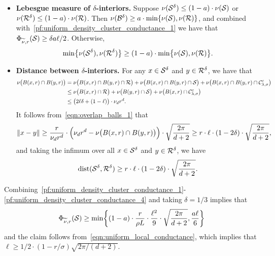 \begin{itemize}
\begin{equation}
		\end{equation}
		\item \textbf{Lebesgue measure of $\delta$-interiors.} Suppose $\nu(\mathcal{S}^{\delta}) \leq (1 - a) \cdot \nu(\mathcal{S})$ or $\nu(\mathcal{R}^{\delta}) \leq (1 - a) \cdot \nu(\mathcal{R})$. Then 
		$\nu(\mathcal{B}^{\delta}) \geq a \cdot \min\{\nu(\mathcal{S}), \nu(\mathcal{R})\}$, and combined with~\eqref{pf:uniform_density_cluster_conductance_1} we have that $\Phi_{\widetilde{\nu},r}(\mathcal{S}) \geq \delta a \ell/2$. Otherwise,
		\begin{equation}
		\label{pf:uniform_density_cluster_conductance_3}
		\min\bigl\{\nu(\mathcal{S}^{\delta}),\nu(\mathcal{R}^{\delta})\bigr\} \geq (1- a) \cdot \min\bigl\{\nu(\mathcal{S}),\nu(\mathcal{R})\bigr\}.
		\end{equation}
		\item \textbf{Distance between $\delta$-interiors.} For any $x \in \mathcal{S}^{\delta}$ and $y \in \mathcal{R}^{\delta}$, we have that 
		\begin{align*}
		\nu\bigl(B(x,r) \cap B(y,r)\bigr) & = \nu\bigl(B(x,r) \cap B(y,r) \cap \mathcal{R}\bigr) + \nu\bigl(B(x,r) \cap B(y,r) \cap \mathcal{S}\bigr) + \nu\bigl(B(x,r) \cap B(y,r) \cap \mathcal{C}_{\lambda,\sigma}^c\bigr) \\
		& \leq \nu\bigl(B(x,r) \cap \mathcal{R}\bigr) + \nu\bigl(B(y,r) \cap \mathcal{S}\bigr) + \nu\bigl(B(x,r) \cap \mathcal{C}_{\lambda,\sigma}^c\bigr) \\
		& \leq \bigl(2\ell\delta + (1 - \ell)\bigr) \cdot \nu_dr^d.
		\end{align*}
		It follows from~\eqref{eqn:overlap_balls_1} that
		\begin{equation*}
		\|x - y\| \geq \frac{r}{\nu_d r^d} \cdot \Bigl(\nu_d r^d - \nu\bigl(B(x,r) \cap B(y,r)\bigr)\Bigr) \cdot \sqrt{\frac{2\pi}{d + 2}} \geq r \cdot \ell \cdot (1 - 2\delta) \cdot \sqrt{\frac{2\pi}{d + 2}},
		\end{equation*}
		and taking the infimum over all $x \in \mathcal{S}^{\delta}$ and $y \in \mathcal{R}^{\delta}$, we have
		\begin{equation}
		\label{pf:uniform_density_cluster_conductance_4}
		\mathrm{dist}(\mathcal{S}^{\delta},\mathcal{R}^{\delta}) \geq r \cdot \ell \cdot (1 - 2\delta) \cdot \sqrt{\frac{2\pi}{d + 2}}.
		\end{equation}
	\end{itemize}	
	Combining~\eqref{pf:uniform_density_cluster_conductance_1}-\eqref{pf:uniform_density_cluster_conductance_4} and taking $\delta = 1/3$ implies that
	\begin{equation*}
	\Phi_{\widetilde{\nu},r}(\mathcal{S}) \geq \min\biggl\{(1 - a) \cdot \frac{r}{\rho L} \cdot \frac{\ell^2}{9} \cdot \sqrt{\frac{2\pi}{d + 2}}, \frac{a\ell}{6}\biggr\}
	\end{equation*}
	and the claim follows from~\eqref{eqn:uniform_local_conductance}, which implies that $\ell \geq 1/2 \cdot (1 - r/\sigma)\sqrt{2\pi/(d + 2)}$.

